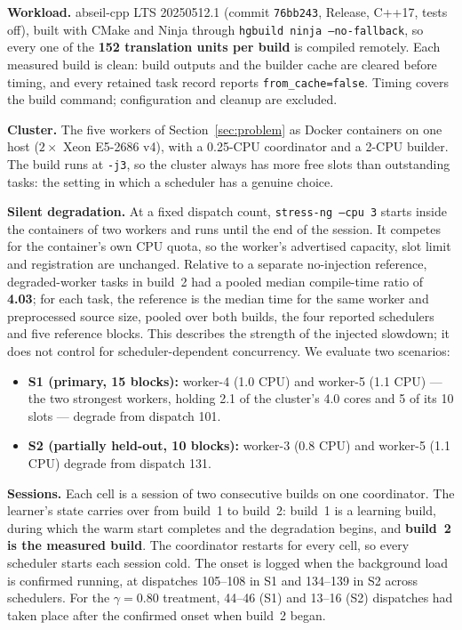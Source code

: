 \documentclass[final,5p,times,twocolumn]{elsarticle}
\begin{document}
\textbf{Workload.} abseil-cpp LTS 20250512.1 (commit \texttt{76bb243}, Release, C++17, tests off), built with CMake and Ninja through \texttt{hgbuild ninja --no-fallback}, so every one of the \textbf{152 translation units per build} is compiled remotely. Each measured build is clean: build outputs and the builder cache are cleared before timing, and every retained task record reports \texttt{from\_cache=false}. Timing covers the build command; configuration and cleanup are excluded.

\textbf{Cluster.} The five workers of Section~\ref{sec:problem} as Docker containers on one host ($2\times$ Xeon E5-2686 v4), with a 0.25-CPU coordinator and a 2-CPU builder. The build runs at \texttt{-j3}, so the cluster always has more free slots than outstanding tasks: the setting in which a scheduler has a genuine choice.

\textbf{Silent degradation.} At a fixed dispatch count, \texttt{stress-ng --cpu 3} starts inside the containers of two workers and runs until the end of the session. It competes for the container's own CPU quota, so the worker's advertised capacity, slot limit and registration are unchanged. Relative to a separate no-injection reference, degraded-worker tasks in build~2 had a pooled median compile-time ratio of \textbf{4.03}; for each task, the reference is the median time for the same worker and preprocessed source size, pooled over both builds, the four reported schedulers and five reference blocks. This describes the strength of the injected slowdown; it does not control for scheduler-dependent concurrency. We evaluate two scenarios:
\begin{itemize}
\item \textbf{S1 (primary, 15 blocks):} worker-4 (1.0 CPU) and worker-5 (1.1 CPU) --- the two strongest workers, holding 2.1 of the cluster's 4.0 cores and 5 of its 10 slots --- degrade from dispatch 101.
\item \textbf{S2 (partially held-out, 10 blocks):} worker-3 (0.8 CPU) and worker-5 (1.1 CPU) degrade from dispatch 131.
\end{itemize}

\textbf{Sessions.} Each cell is a session of two consecutive builds on one coordinator. The learner's state carries over from build~1 to build~2: build~1 is a learning build, during which the warm start completes and the degradation begins, and \textbf{build~2 is the measured build}. The coordinator restarts for every cell, so every scheduler starts each session cold. The onset is logged when the background load is confirmed running, at dispatches 105--108 in S1 and 134--139 in S2 across schedulers. For the $\gamma=0.80$ treatment, 44--46 (S1) and 13--16 (S2) dispatches had taken place after the confirmed onset when build~2 began.
\end{document}
